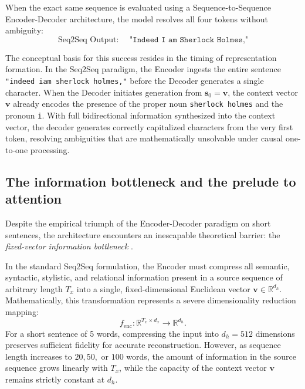 \documentclass[../../../main.tex]{subfiles}
\begin{document}
When the exact same sequence is evaluated using a Sequence-to-Sequence Encoder-Decoder architecture, the model resolves all four tokens without ambiguity:
\begin{equation}
\text{Seq2Seq Output: } \quad \texttt{"Indeed I am Sherlock Holmes,"}
\end{equation}

The conceptual basis for this success resides in the timing of representation formation. In the Seq2Seq paradigm, the Encoder ingests the entire sentence \texttt{"indeed iam sherlock holmes,"} before the Decoder generates a single character. When the Decoder initiates generation from $\mathbf{s}_0 = \mathbf{v}$, the context vector $\mathbf{v}$ already encodes the presence of the proper noun \texttt{sherlock holmes} and the pronoun \texttt{i}. With full bidirectional information synthesized into the context vector, the decoder generates correctly capitalized characters from the very first token, resolving ambiguities that are mathematically unsolvable under causal one-to-one processing.

\subsection{The information bottleneck and the prelude to attention}
\label{subsec:rnn_information_bottleneck}

Despite the empirical triumph of the Encoder-Decoder paradigm on short sentences, the architecture encounters an inescapable theoretical barrier: the \textit{fixed-vector information bottleneck} \citep{bahdanau2014}.

In the standard Seq2Seq formulation, the Encoder must compress all semantic, syntactic, stylistic, and relational information present in a source sequence of arbitrary length $T_x$ into a single, fixed-dimensional Euclidean vector $\mathbf{v} \in \mathbb{R}^{d_h}$. Mathematically, this transformation represents a severe dimensionality reduction mapping:
\begin{equation}
f_{\text{enc}}: \mathbb{R}^{T_x \times d_x} \longrightarrow \mathbb{R}^{d_h}.
\end{equation}
For a short sentence of 5 words, compressing the input into $d_h = 512$ dimensions preserves sufficient fidelity for accurate reconstruction. However, as sequence length increases to $20, 50,$ or $100$ words, the amount of information in the source sequence grows linearly with $T_x$, while the capacity of the context vector $\mathbf{v}$ remains strictly constant at $d_h$.
\end{document}
